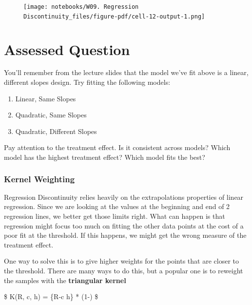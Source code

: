 \documentclass[
  letterpaper,
  DIV=11,
  numbers=noendperiod]{scrreprt}
\providecommand{\tightlist}{%
  \setlength{\itemsep}{0pt}\setlength{\parskip}{0pt}}\usepackage{longtable,booktabs,array}
\begin{document}
\begin{figure}[H]

{\centering \texttt{[image: notebooks/W09. Regression Discontinuity\_files/figure-pdf/cell-12-output-1.png]}

}

\end{figure}


\hypertarget{assessed-question-7}{%
\chapter{Assessed Question}\label{assessed-question-7}}

You'll remember from the lecture slides that the model we've fit above
is a linear, different slopes design. Try fitting the following models:

\begin{enumerate}
\def\labelenumi{\arabic{enumi}.}
\tightlist
\item
  Linear, Same Slopes
\item
  Quadratic, Same Slopes
\item
  Quadratic, Different Slopes
\end{enumerate}

Pay attention to the treatment effect. Is it consistent across models?
Which model has the highest treatment effect? Which model fits the best?

\hypertarget{kernel-weighting}{%
\subsection{Kernel Weighting}\label{kernel-weighting}}

Regression Discontinuity relies heavily on the extrapolations properties
of linear regression. Since we are looking at the values at the
beginning and end of 2 regression lines, we better get those limits
right. What can happen is that regression might focus too much on
fitting the other data points at the cost of a poor fit at the
threshold. If this happens, we might get the wrong measure of the
treatment effect.

One way to solve this is to give higher weights for the points that are
closer to the threshold. There are many ways to do this, but a popular
one is to reweight the samples with the \textbf{triangular kernel}

\$ K(R, c, h) = \{\textbar R-c\textbar{} \leq h\} *
\bigg(1-\bigg) \$
\end{document}
